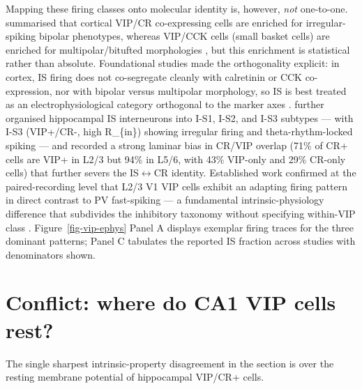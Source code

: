 \documentclass[11pt]{article}
\let\origleftrightarrow\leftrightarrow
\def\leftrightarrow{\ensuremath{\origleftrightarrow}}
\begin{document}
Mapping these firing classes onto molecular identity is, however, \textit{not} one-to-one. \citet{Tremblay2016} summarised that cortical VIP/CR co-expressing cells are enriched for irregular-spiking bipolar phenotypes, whereas VIP/CCK cells (small basket cells) are enriched for multipolar/bitufted morphologies \citep{Tremblay2016}, but this enrichment is statistical rather than absolute. Foundational studies made the orthogonality explicit: in cortex, IS firing does not co-segregate cleanly with calretinin or CCK co-expression, nor with bipolar versus multipolar morphology, so IS is best treated as an electrophysiological category orthogonal to the marker axes \citep{Guetmccreight2020b}. \citet{Guetmccreight2020b} further organised hippocampal IS interneurons into I-S1, I-S2, and I-S3 subtypes --- with I-S3 (VIP+/CR-, high R\_\{in\}) showing irregular firing and theta-rhythm-locked spiking --- and recorded a strong laminar bias in CR/VIP overlap (71\% of CR+ cells are VIP+ in L2/3 but 94\% in L5/6, with 43\% VIP-only and 29\% CR-only cells) that further severs the IS\leftrightarrow CR identity. Established work confirmed at the paired-recording level that L2/3 V1 VIP cells exhibit an adapting firing pattern in direct contrast to PV fast-spiking --- a fundamental intrinsic-physiology difference that subdivides the inhibitory taxonomy without specifying within-VIP class \citep{Walker2016}. Figure~\ref{fig-vip-ephys} Panel A displays exemplar firing traces for the three dominant patterns; Panel C tabulates the reported IS fraction across studies with denominators shown.

\section{Conflict: where do CA1 VIP cells rest?}\label{sec-05-conflict-rmp}

The single sharpest intrinsic-property disagreement in the section is over the resting membrane potential of hippocampal VIP/CR+ cells.
\end{document}
